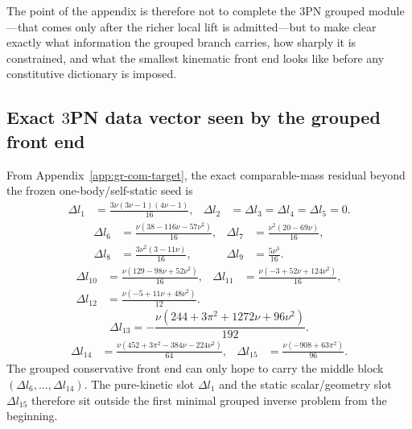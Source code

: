 \documentclass[11pt]{article}
\begin{document}
The point of the appendix is therefore not to complete the $3$PN grouped
module---that comes only after the richer local lift is admitted---but to make
clear exactly what information the grouped branch carries, how sharply it is
constrained, and what the smallest kinematic front end looks like before any
constitutive dictionary is imposed.

\subsection{Exact \texorpdfstring{$3$}{3}PN data vector seen by the grouped front end}
\label{app:grouped-p2-target-pack-data}

From Appendix~\ref{app:gr-com-target}, the exact comparable-mass residual beyond
the frozen one-body/self-static seed is
\begin{equation}
\begin{aligned}
 \Delta l_1&=\frac{3\nu(3\nu-1)(4\nu-1)}{16},
 & \Delta l_2&=\Delta l_3=\Delta l_4=\Delta l_5=0.
\end{aligned}
\label{eq:app-grouped-p2-target-pack-dl-1-5}
\end{equation}
\begin{equation}
\begin{aligned}
 \Delta l_6&=\frac{\nu(38-116\nu-57\nu^2)}{16},
 & \Delta l_7&=\frac{\nu^2(20-69\nu)}{16},
\\[0.5ex]
 \Delta l_8&=\frac{3\nu^2(3-11\nu)}{16},
 & \Delta l_9&=\frac{5\nu^3}{16}.
\end{aligned}
\label{eq:app-grouped-p2-target-pack-dl-6-9}
\end{equation}
\begin{equation}
\begin{aligned}
 \Delta l_{10}&=\frac{\nu(129-98\nu+52\nu^2)}{16},
 & \Delta l_{11}&=\frac{\nu(-3+52\nu+124\nu^2)}{16},
\\[0.5ex]
 \Delta l_{12}&=\frac{\nu(-5+11\nu+48\nu^2)}{12}.
\end{aligned}
\label{eq:app-grouped-p2-target-pack-dl-10-12}
\end{equation}
\begin{equation}
 \Delta l_{13}=-\frac{\nu(244+3\pi^2+1272\nu+96\nu^2)}{192}.
\label{eq:app-grouped-p2-target-pack-dl-13}
\end{equation}
\begin{equation}
\begin{aligned}
 \Delta l_{14}&=\frac{\nu(452+3\pi^2-384\nu-224\nu^2)}{64},
 & \Delta l_{15}&=\frac{\nu(-908+63\pi^2)}{96}.
\end{aligned}
\label{eq:app-grouped-p2-target-pack-dl-14-15}
\end{equation}
The grouped conservative front end can only hope to carry the middle block
\((\Delta l_6,\dots,\Delta l_{14})\).  The pure-kinetic slot \(\Delta l_1\) and the
static scalar/geometry slot \(\Delta l_{15}\) therefore sit outside the first
minimal grouped inverse problem from the beginning.
\end{document}
